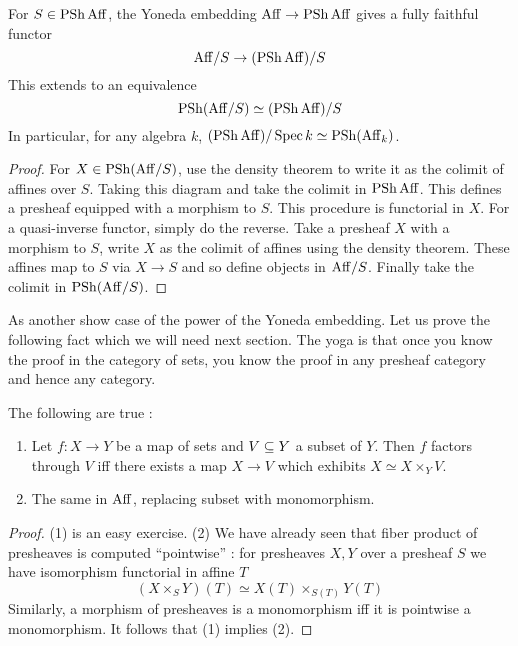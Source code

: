 \documentclass[./main.tex]{subfiles}
\begin{document}
\begin{prop}
  For $S \in \operatorname{PSh} \mathrm{Aff}$,
  the Yoneda embedding $\mathrm{Aff} \to \operatorname{PSh} \mathrm{Aff}$
  gives a fully faithful functor
  \[
    \mathrm{Aff} / S \to (\operatorname{PSh} \mathrm{Aff}) / S 
  \]
  This extends to an equivalence \[
    \operatorname{PSh}(\mathrm{Aff} / S) \simeq (\operatorname{PSh} \mathrm{Aff}) / S
  \]
  In particular,
  for any algebra $k$,
  $(\operatorname{PSh} \mathrm{Aff}) / \operatorname{Spec} k \simeq \operatorname{PSh}(\mathrm{Aff}_k)$.
\end{prop}
\begin{proof}
  For $X \in \operatorname{PSh}(\mathrm{Aff} / S)$,
  use the density theorem to write it as the colimit
  of affines over $S$.
  Taking this diagram and take the colimit in $\operatorname{PSh} \mathrm{Aff}$.
  This defines a presheaf equipped with a morphism to $S$.
  This procedure is functorial in $X$.
  For a quasi-inverse functor,
  simply do the reverse.
  Take a presheaf $X$ with a morphism to $S$,
  write $X$ as the colimit of affines using the density theorem.
  These affines map to $S$ via $X \to S$
  and so define objects in $\mathrm{Aff} / S$.
  Finally take the colimit in $\operatorname{PSh}(\mathrm{Aff} / S)$.
\end{proof}

As another show case of the power of the Yoneda embedding.
Let us prove the following fact which we will need next section.
The yoga is that once you know the proof in the category of sets,
you know the proof in any presheaf category and hence
any category.
\begin{prop}
  The following are true : 
  \begin{enumerate}
    \item Let $f : X \to Y$ be a map of sets and
    $V \subseteq Y$ a subset of $Y$.
    Then $f$ factors through $V$ iff there exists
    a map $X \to V$ which exhibits $X \simeq X \times_Y V$.
    \item The same in $\mathrm{Aff}$,
    replacing subset with monomorphism.
  \end{enumerate}
\end{prop}
\begin{proof}
  (1) is an easy exercise.
  (2) We have already seen that
  fiber product of presheaves is computed
  ``pointwise'' : 
  for presheaves $X , Y$ over a presheaf $S$
  we have isomorphism functorial in affine $T$
  \[
    (X \times_S Y)(T) \simeq X(T) \times_{S(T)} Y(T)
  \]
  Similarly, a morphism of presheaves
  is a monomorphism iff it is pointwise a monomorphism.
  It follows that (1) implies (2).
\end{proof}
\end{document}
